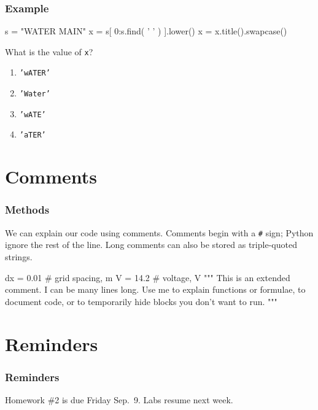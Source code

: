 \documentclass[11pt]{beamer}
\begin{document}
\begin{frame}[fragile]
  \frametitle{Example}
  \Enlarge

  \begin{semiverbatim}
s = "WATER MAIN"
x = s[ 0:s.find( ' ' ) ].lower()
x = x.title().swapcase()
  \end{semiverbatim}
  What is the value of \texttt{x}?
  \begin{enumerate}[label=\Alph*]
  \item  \texttt{'wATER'}
  \item  \texttt{'Water'}
  \item  \texttt{'wATE'}
  \item  \texttt{'aTER'}
  \end{enumerate}
\end{frame}

\section{Comments}

\begin{frame}[fragile]
  \frametitle{Methods}
  \Enlarge

  \begin{itemize}
  \myitem  We can explain our code using comments. \pause
  \myitem  Comments begin with a \texttt{\#} sign; Python ignore the rest of the line. \pause
  \myitem  Long comments can also be stored as triple-quoted strings. \pause
    \begin{semiverbatim}
dx = 0.01  # grid spacing, m
V  = 14.2  # voltage, V
"""
This is an extended comment.
I can be many lines long.
Use me to explain functions or formulae, to document code,
or to temporarily hide blocks you don't want to run.
"""
    \end{semiverbatim}
  \end{itemize}
\end{frame}

\section{Reminders}

\begin{frame}
  \frametitle{Reminders}
  \Enlarge

  \begin{itemize}
  \myitem  Homework \#2 is due Friday Sep.\ 9.
  \myitem  Labs resume next week.
  \end{itemize}
\end{frame}
\end{document}
